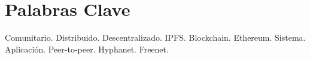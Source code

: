 \section{Palabras Clave}

Comunitario. Distribuido. Descentralizado. IPFS. Blockchain. Ethereum. Sistema. Aplicación. Peer-to-peer. Hyphanet. Freenet.